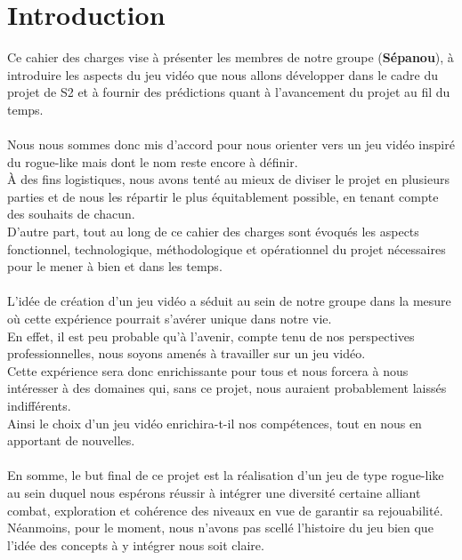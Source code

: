 \documentclass{article}
\title{
    \textbf{ \begin{center} \Huge Cahier des charges \end{center} }
    \textrm{ \underline{Groupe :} Sépanou }
}
\author{
    LO Jean-Pierre | MICHALON Loïc \and
    MICHOT Maxence | TCHEKACHEV David
}
\date{Janvier 2021}
\begin{document}
\maketitle

\pagebreak

\renewcommand*\contentsname{\textbf{\Huge Sommaire \newline}}
\large \tableofcontents

\pagebreak
\normalsize
\section{Introduction}


Ce cahier des charges vise à présenter les membres de notre groupe (\textbf{Sépanou}), à introduire les aspects du jeu vidéo que nous allons développer dans le cadre du projet de S2 et à fournir des prédictions quant à l'avancement du projet au fil du temps. \\
\\
Nous nous sommes donc mis d'accord pour nous orienter vers un jeu vidéo inspiré du rogue-like mais dont le nom reste encore à définir. \\
À des fins logistiques, nous avons tenté au mieux de diviser le projet en plusieurs parties et de nous les répartir le plus équitablement possible, en tenant compte des souhaits de chacun. \\
D'autre part, tout au long de ce cahier des charges sont évoqués les aspects fonctionnel, technologique, méthodologique et opérationnel du projet nécessaires pour le mener à bien et dans les temps. \\
\\
L'idée de création d'un jeu vidéo a séduit au sein de notre groupe dans la mesure où cette expérience pourrait s'avérer unique dans notre vie. \\
En effet, il est peu probable qu'à l'avenir, compte tenu de nos perspectives professionnelles, nous soyons amenés à travailler sur un jeu vidéo. \\
Cette expérience sera donc enrichissante pour tous et nous forcera à nous intéresser à des domaines qui, sans ce projet, nous auraient probablement laissés indifférents. \\
Ainsi le choix d'un jeu vidéo enrichira-t-il nos compétences, tout en nous en apportant de nouvelles. \\
\\
En somme, le but final de ce projet est la réalisation d'un jeu de type rogue-like au sein duquel nous espérons réussir à intégrer une diversité certaine alliant combat, exploration et cohérence des niveaux en vue de garantir sa rejouabilité. \\
Néanmoins, pour le moment, nous n'avons pas scellé l'histoire du jeu bien que l'idée des concepts à y intégrer nous soit claire.
\end{document}
